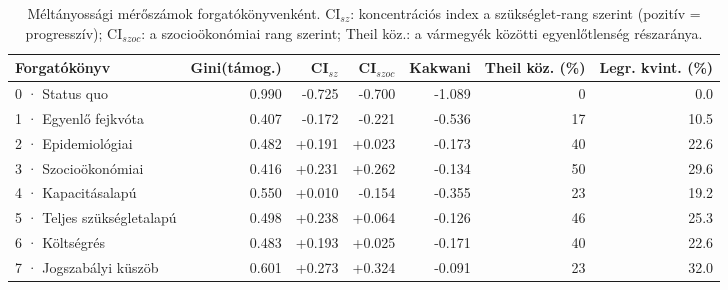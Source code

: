 \begin{table}[htbp]
\centering
\small
\caption{Méltányossági mérőszámok forgatókönyvenként. CI$_{sz}$: koncentrációs index a szükséglet‑rang szerint (pozitív = progresszív); CI$_{szoc}$: a szocioökonómiai rang szerint; Theil köz.: a vármegyék közötti egyenlőtlenség részaránya.}
\label{tab:equity}
\begin{tabular}{p{3.5cm}rrrrrr}
\toprule
Forgatókönyv & Gini(támog.) & CI$_{sz}$ & CI$_{szoc}$ & Kakwani & Theil köz. (\%) & Legr. kvint. (\%) \\
\midrule
0 · Status quo & 0.990 & -0.725 & -0.700 & -1.089 & 0 & 0.0 \\
1 · Egyenlő fejkvóta & 0.407 & -0.172 & -0.221 & -0.536 & 17 & 10.5 \\
2 · Epidemiológiai & 0.482 & +0.191 & +0.023 & -0.173 & 40 & 22.6 \\
3 · Szocioökonómiai & 0.416 & +0.231 & +0.262 & -0.134 & 50 & 29.6 \\
4 · Kapacitásalapú & 0.550 & +0.010 & -0.154 & -0.355 & 23 & 19.2 \\
5 · Teljes szükségletalapú & 0.498 & +0.238 & +0.064 & -0.126 & 46 & 25.3 \\
6 · Költségrés & 0.483 & +0.193 & +0.025 & -0.171 & 40 & 22.6 \\
7 · Jogszabályi küszöb & 0.601 & +0.273 & +0.324 & -0.091 & 23 & 32.0 \\
\bottomrule
\end{tabular}
\end{table}
